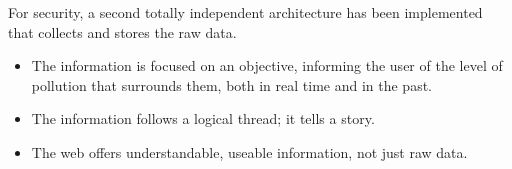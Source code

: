 For security, a second totally independent architecture has been implemented that collects and stores the raw data.

\begin{itemize}
    \item The information is focused on an objective, informing the user of the level of pollution that surrounds them, both  in real time and in the past.
    \item The information follows a logical thread; it tells a story.
    \item The web offers understandable, useable information, not just raw data.
\end{itemize}